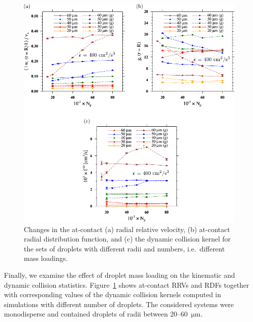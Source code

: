 \documentclass[../thesis.tex]{subfiles}
\begin{document}
\begin{figure}%
\center
\includegraphics[width=\textwidth]{../figs/JFM/fig17.pdf}
\caption{Changes in the at-contact (a) radial relative velocity, (b) at-contact radial distribution function, and (c) the dynamic collision kernel for the sets of droplets with different radii and numbers, i.e.\ different mass loadings.}
\label{Fig17}
\end{figure}%

Finally, we examine the effect of droplet mass loading on the kinematic and dynamic collision statistics. Figure~\ref{Fig17} shows at-contact RRVs and RDFs together with corresponding values of the dynamic collision kernels computed in simulations with different number of droplets. The considered systems were monodisperse and contained droplets of radii between 20--60~$\mathrm{\mu m}$. 
\end{document}
